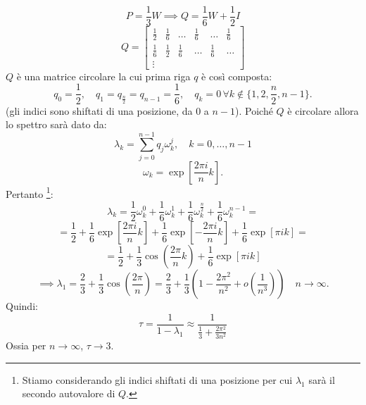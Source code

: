 \begin{alphaparts}
   \questionpart %
   \[P = \frac{1}{3} W \implies Q = \frac{1}{6}W + \frac{1}{2}I\]
   \[Q = \begin{bmatrix}
       \frac{1}{2} & \frac{1}{6} & \dots & \frac{1}{6} & \dots & \frac{1}{6} \\
       \frac{1}{6} & \frac{1}{2} & \frac{1}{6} & \dots & \frac{1}{6} & \dots \\
       \vdots 
   \end{bmatrix}\]
   \(Q\) è una matrice circolare la cui prima riga \(q\) è così composta:
   \[q_0 = \frac{1}{2},\quad q_1 = q_{\frac{n}{2}} = q_{n - 1} = \frac{1}{6}, \quad q_k = 0\,  \forall k\notin \{1, 2, \frac{n}{2}, n - 1\}.\]
   (gli indici sono shiftati di una posizione, da \(0\) a \(n - 1\)).
   Poiché \(Q\) è circolare allora lo spettro sarà dato da:
   \[\lambda_k =  \sum \limits_{j = 0}^{n - 1} q_j \omega_k^j,\quad k = 0, \dots , n - 1\]
   \[\omega_k = \exp\left[{\frac{2 \pi i }{n}k}\right].\]
   Pertanto \footnote{Stiamo considerando gli indici shiftati di una posizione per cui \(\lambda_1\) sarà il secondo autovalore di \(Q\).}:
   \[ \lambda_k = \frac{1}{2} \omega_k^0 + \frac{1}{6}\omega_k^1 + \frac{1}{6}\omega_k^{\frac{n}{2}} + \frac{1}{6} \omega_k^{n - 1} =
    \]
    \[ = \frac{1}{2} + \frac{1}{6}\exp \left[ \frac{2 \pi i }{n}k\right] + \frac{1}{6}\exp \left[ -\frac{2 \pi i }{n}k\right] + \frac{1}{6}\exp \left[ \pi i k\right] =\]
    \[ = \frac{1}{2} + \frac{1}{3} \cos \left(\frac{2 \pi}{n}k\right) + \frac{1}{6}\exp \left[ \pi i k\right]\]
    \[ \implies \lambda_1 = \frac{2}{3} + \frac{1}{3}\cos\left(\frac{2 \pi}{n}\right) = \frac{2}{3} + \frac{1}{3}\left(1 -\frac{2\pi^2}{n^2} + o\left(\frac{1}{n^3}\right)\right)\quad n \to \infty.\]
    Quindi:
    \[\tau = \frac{1}{1 - \lambda_1} \approx \frac{1}{\frac{1}{3} + \frac{2\pi^2}{3n^2}}\]
    Ossia per \(n \to \infty\), \(\tau \to 3\).


\end{alphaparts}

